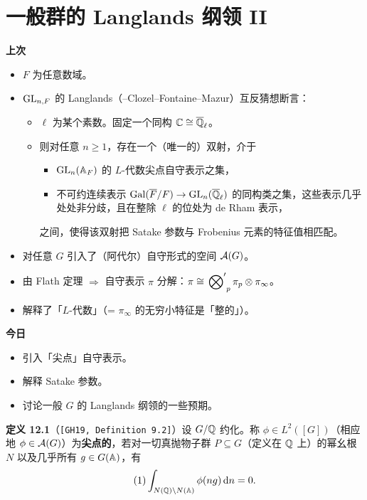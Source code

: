 \chapter{一般群的 Langlands 纲领 II}

\noindent\textbf{上次}
\begin{itemize}
\item $F$ 为任意数域。
\item $\operatorname{GL}_{n,F}$ 的 Langlands（–Clozel–Fontaine–Mazur）互反猜想断言：
\begin{itemize}
\item $\ell$ 为某个素数。固定一个同构 $\mathbb{C}\cong\overline{\mathbb{Q}}_\ell$。
\item 则对任意 $n\ge1$，存在一个（唯一的）双射，介于
\begin{itemize}
\item[(i)] $\operatorname{GL}_n(\mathbb{A}_F)$ 的 $L$-代数尖点自守表示之集，
\item[(ii)] 不可约连续表示 $\operatorname{Gal}(\overline F/F)\to\operatorname{GL}_n(\overline{\mathbb{Q}}_\ell)$ 的同构类之集，这些表示几乎处处非分歧，且在整除 $\ell$ 的位处为 de Rham 表示，
\end{itemize}
之间，使得该双射把 Satake 参数与 Frobenius 元素的特征值相匹配。
\end{itemize}
\item 对任意 $G$ 引入了（阿代尔）自守形式的空间 $\mathcal{A}(G)$。
\item 由 Flath 定理 $\Rightarrow$ 自守表示 $\pi$ 分解：$\pi\cong\sideset{}{'}\bigotimes_p\pi_p\otimes\pi_\infty$。
\item 解释了「$L$-代数」（= $\pi_\infty$ 的无穷小特征是「整的」）。
\end{itemize}

\medskip
\noindent\textbf{今日}
\begin{itemize}
\item 引入「尖点」自守表示。
\item 解释 Satake 参数。
\item 讨论一般 $G$ 的 Langlands 纲领的一些预期。
\end{itemize}

\medskip
\noindent\textbf{定义 12.1}（\texttt{[GH19, Definition 9.2]}）\label{def:12.1}\quad 设 $G/\mathbb{Q}$ 约化。称 $\phi\in L^2([G])$（相应地 $\phi\in\mathcal{A}(G)$）为\textbf{尖点的}，若对一切真抛物子群 $P\subseteq G$（定义在 $\mathbb{Q}$ 上）的幂幺根 $N$ 以及几乎所有 $g\in G(\mathbb{A})$，有
\begin{equation}\tag{1}\label{eq:12.1}
\int_{N(\mathbb{Q})\backslash N(\mathbb{A})}\phi(ng)\,\mathrm{d}n=0.
\end{equation}

